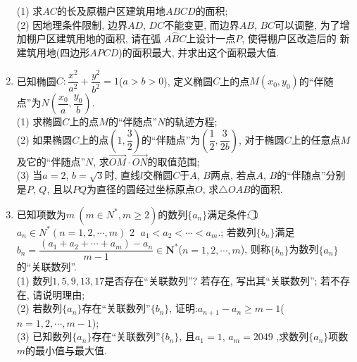 \documentclass[10pt,a4paper]{article}
\begin{document}
\begin{enumerate}[1.]
\begin{center}
\end{center}
(1) 求$AC$的长及原棚户区建筑用地$ABCD$的面积;\\
(2) 因地理条件限制, 边界$AD$, $DC$不能变更, 而边界$AB$, $BC$可以调整, 为了增加棚户区建筑用地的面积, 请在弧 $\overset\frown{ABC}$上设计一点$P$, 使得棚户区改造后的
新建筑用地(四边形$APCD$)的面积最大, 并求出这个面积最大值.
\item 已知椭圆$C:\dfrac{x^2}{a^2}+\dfrac{y^2}{b^2}=1$($a>b>0$), 定义椭圆$C$上的点$M(x_0,y_0)$的``伴随点''为$N(\dfrac{x_0}a,\dfrac{y_0}b)$.\\
(1) 求椭圆$C$上的点$M$的``伴随点''$N$的轨迹方程;\\
(2) 如果椭圆$C$上的点$(1,\dfrac 32)$的``伴随点''为$(\dfrac 12,\dfrac 3{2b})$, 对于椭圆$C$上的任意点$M$及它的``伴随点''$N$, 求$\overrightarrow{OM}\cdot \overrightarrow{ON}$的取值范围;\\
(3) 当$a=2$, $b=\sqrt 3$时, 直线$l$交椭圆$C$于$A$, $B$两点, 若点$A$, $B$的``伴随点''分别是$P$, $Q$, 且以$PQ$为直径的圆经过坐标原点$O$, 求$\triangle OAB$的面积.
\item 已知项数为$m\ (m\in {N^*},m\ge 2)$的数列$\{ {a_n} \}$满足条件:
\textcircled{1}  $a_n\in {N^*}(n=1,2,\cdots ,m)$    \textcircled{2}  $a_1<a_2<\cdots <a_m$.;
若数列$\{b_n\}$满足 $b_n=\dfrac{(a_1+a_2+\cdots +a_m)-a_n}{m-1}\in \mathbf{N}^*$($n=1,2,\cdots ,m$), 则称$\{b_n\}$为数列$\{a_n\}$的``关联数列''.\\
(1) 数列$1, 5, 9, 13, 17$是否存在``关联数列''? 若存在, 写出其``关联数列''; 若不存在, 请说明理由;\\
(2) 若数列$\{a_n\}$存在``关联数列''$\{b_n\}$, 证明:$a_{n+1}-a_n\ge m-1$($n=1,2,\cdots ,m-1$);\\
(3) 已知数列$\{a_n\}$存在``关联数列''$\{b_n\}$, 且$a_1=1$, $a_m=2049$ ,求数列$\{a_n\}$项数$m$的最小值与最大值.


\end{enumerate}
\end{document}
